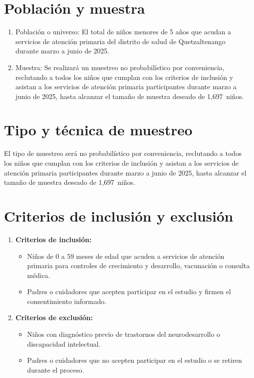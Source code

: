 \documentclass[11pt,letterpaper]{report}
\newcommand{\tiempito}{marzo a junio de 2025}
\newcommand{\muestradeseada}{1,697}
\begin{document}
\section{Población y muestra}

\begin{enumerate}
	\item Población o universo:
		El total de niños menores de 5 años que acudan a servicios de atención
		primaria del distrito de salud de Quetzaltenango durante \tiempito.
	\item Muestra:
		Se realizará un muestreo no probabilístico por conveniencia, reclutando
		a todos los niños que cumplan con los criterios de inclusión y asistan
		a los servicios de atención primaria participantes durante \tiempito,
		hasta alcanzar el tamaño de muestra deseado de \muestradeseada\ niños.
\end{enumerate}

\section{Tipo y técnica de muestreo}
El tipo de muestreo será no probabilístico por conveniencia, reclutando a todos
los niños que cumplan con los criterios de inclusión y asistan a los servicios
de atención primaria participantes durante \tiempito, hasta alcanzar el tamaño
de muestra deseado de \muestradeseada\ niños.

\section{Criterios de inclusión y exclusión}
\begin{enumerate}
	\item \textbf{Criterios de inclusión:}
		\begin{itemize}
		\item Niños de 0 a 59 meses de edad que acuden a servicios de atención
		primaria para controles de crecimiento y desarrollo, vacunación o
		consulta médica.
		\item Padres o cuidadores que acepten participar en el estudio y firmen
		el consentimiento informado. 
		\end{itemize}
	\item \textbf{Criterios de exclusión:}
		\begin{itemize}
		\item Niños con diagnóstico previo de trastornos del neurodesarrollo o
		discapacidad intelectual. 
		\item Padres o cuidadores que no acepten participar en el estudio o se
		retiren durante el proceso.
		\end{itemize}
\end{enumerate}
\end{document}
